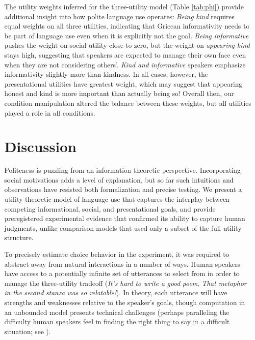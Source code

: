 \documentclass[9pt,twocolumn,twoside,lineno]{main_class_file}
\begin{document}
The utility weights inferred for the three-utility model (Table \ref{tab:phi})
provide additional insight into how polite language use operates:
\emph{Being kind} requires equal weights on all three utilities,
indicating that Gricean informativity needs to be part of language use
even when it is explicitly not the goal.
\emph{Being informative} pushes
the weight on social utility close to zero, but the weight on
\emph{appearing kind} stays high, suggesting that speakers are expected
to manage their own face even when they are not considering others'.
\emph{Kind and informative} speakers emphasize informativity slightly
more than kindness. In all cases, however, the presentational utilities
have greatest weight, which may suggest that appearing honest and kind
is more important than actually being so! Overall then, our condition
manipulation altered the balance between these weights, but all
utilities played a role in all conditions.

\section*{Discussion}

Politeness is puzzling from an information-theoretic perspective.
Incorporating social motivations adds a level of explanation, but so far such intuitions and observations have resisted both formalization and precise testing.
We present a utility-theoretic model of language use that captures the interplay between competing
informational, social, and presentational goals, and provide preregistered
experimental evidence that confirmed its ability to capture human
judgments, unlike comparison models that used only a subset of the full
utility structure.

To precisely estimate choice behavior in the experiment,
it was required to abstract away
from natural interactions in a number of ways.
Human speakers have access
to a potentially infinite set of utterances to select from in order to manage the three-utility tradeoff (\emph{It's hard to write a good poem}, \emph{That
metaphor in the second stanza was so relatable!}). In theory,
each utterance will have strengths and weaknesses relative to the
speaker's goals, though computation in an unbounded model presents
technical challenges (perhaps paralleling the difficulty human speakers
feel in finding the right thing to say in a difficult situation; see \cite{goodman2016}).
\end{document}
